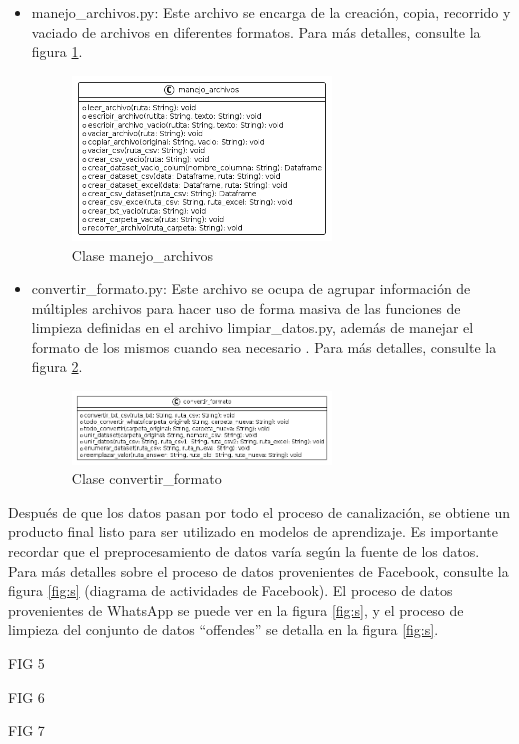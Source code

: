 \begin{itemize}

\item manejo\_archivos.py: Este archivo se encarga de la creación, copia, recorrido y vaciado de archivos en diferentes formatos. Para más detalles, consulte la figura \ref{fig:uml3}.

\begin{figure}
	\includegraphics[width=0.65\textwidth]{capitulo5/figuras/fig3.png}
	\caption{Clase manejo\_archivos}
	\label{fig:uml3}
\end{figure}


\item convertir\_formato.py: Este archivo se ocupa de agrupar información de múltiples archivos para hacer uso de forma masiva de las funciones de limpieza definidas en el archivo limpiar\_datos.py, además de manejar el formato de los mismos cuando sea necesario . Para más detalles, consulte la figura \ref{fig:uml4}.

\begin{figure}
	\includegraphics[width=0.65\textwidth]{capitulo5/figuras/fig4.png}
	\caption{Clase convertir\_formato}
	\label{fig:uml4}
\end{figure}

\end{itemize}

Después de que los datos pasan por todo el proceso de canalización, se obtiene un producto final listo para ser utilizado en modelos de aprendizaje. Es importante recordar que el preprocesamiento de datos varía según la fuente de los datos. Para más detalles sobre el proceso de datos provenientes de Facebook, consulte la figura \ref{fig:s} (diagrama de actividades de Facebook). El proceso de datos provenientes de WhatsApp se puede ver en la figura \ref{fig:s}, y el proceso de limpieza del conjunto de datos ``offendes'' se detalla en la figura \ref{fig:s}.

FIG 5

FIG 6

FIG 7
